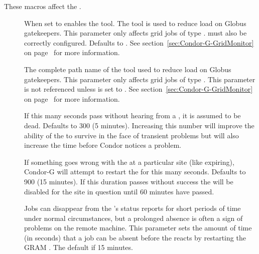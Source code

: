 These macros affect the .
\begin{description}

\item[] \label{param:EnableGridMonitor}
  When set to  enables the  tool.  The
   tool is used to reduce load on Globus gatekeepers.
  This parameter only affects 
  grid jobs of type .
   must also be correctly configured.
  Defaults to .
  See section~\ref{sec:Condor-G-GridMonitor} on
  page~\pageref{sec:Condor-G-GridMonitor}
  for more information.

\item[] \label{param:GridMonitor}
  The complete path name of the  tool used to reduce load on
  Globus gatekeepers.  This parameter only affects 
  grid jobs of type .
  This parameter is not referenced unless
   is set to . 
  See section~\ref{sec:Condor-G-GridMonitor} on
  page~\pageref{sec:Condor-G-GridMonitor}
  for more information.

\item[] \label{param:GridMonitorHeartbeatTimeout}
  If this many seconds pass without hearing from a , it is
  assumed to be dead.  Defaults to 300 (5 minutes).  Increasing this number
  will improve the ability of the  to survive in the face of
  transient problems but will also increase the time before Condor notices a
  problem.

\item[] \label{param:GridMonitorRetryDuration}
  If something goes wrong with the  at a particular site
  (like  expiring), Condor-G will
  attempt to restart the  for this many seconds.  Defaults
  to 900 (15 minutes).  If this duration passes without success the
   will be disabled for the site in question until 60
  minutes have passed.

\item[] \label{param:GridMonitorNoStatusTimeout}
  Jobs can disappear from the 's status reports for
  short periods of time under normal circumstances, but a prolonged
  absence is often a sign of problems on the remote machine. This parameter
  sets the amount of time (in seconds) that a job can be absent before the
   reacts by restarting the GRAM .
  The default if 15 minutes.

\end{description}


